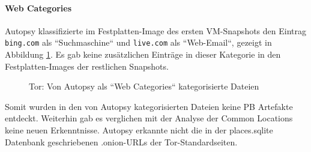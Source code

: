 \begin{appendices}
		\paragraph*{Web Categories}
		Autopsy klassifizierte im Festplatten-Image des ersten VM-Snapshots den Eintrag \texttt{bing.com} als ``Suchmaschine``  und \texttt{live.com} als ``Web-Email``, gezeigt in Abbildung \ref{img:tor-web-categories}.
		Es gab keine zusätzlichen Einträge in dieser Kategorie in den Festplatten-Images der restlichen Snapshots.
		\begin{figure}[h!]
			\centerline{} 
			\caption{Tor: Von Autopsy als ``Web Categories`` kategorisierte Dateien}
			\label{img:tor-web-categories} 
		\end{figure}
		
		Somit wurden in den von Autopsy kategorisierten Dateien keine PB Artefakte entdeckt. Weiterhin gab es verglichen mit der Analyse der Common Locations keine neuen Erkenntnisse. Autopsy erkannte nicht die in der places.sqlite Datenbank geschriebenen .onion-URLs der Tor-Standardseiten.
		
		

\end{appendices}
